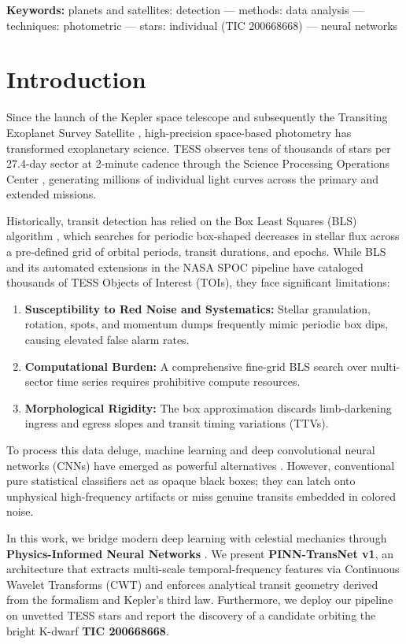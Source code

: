 \documentclass[11pt,a4paper]{article}
\begin{document}
\textbf{Keywords:} planets and satellites: detection --- methods: data analysis --- techniques: photometric --- stars: individual (TIC 200668668) --- neural networks

\clearpage

\section{Introduction}

Since the launch of the Kepler space telescope and subsequently the Transiting Exoplanet Survey Satellite \citep[TESS;][]{ricker2015transiting}, high-precision space-based photometry has transformed exoplanetary science. TESS observes tens of thousands of stars per 27.4-day sector at 2-minute cadence through the Science Processing Operations Center \citep[SPOC;][]{guerrero2021tess}, generating millions of individual light curves across the primary and extended missions.

Historically, transit detection has relied on the Box Least Squares (BLS) algorithm \citep{kovacs2002box}, which searches for periodic box-shaped decreases in stellar flux across a pre-defined grid of orbital periods, transit durations, and epochs. While BLS and its automated extensions in the NASA SPOC pipeline have cataloged thousands of TESS Objects of Interest (TOIs), they face significant limitations:
\begin{enumerate}
    \item \textbf{Susceptibility to Red Noise and Systematics:} Stellar granulation, rotation, spots, and momentum dumps frequently mimic periodic box dips, causing elevated false alarm rates.
    \item \textbf{Computational Burden:} A comprehensive fine-grid BLS search over multi-sector time series requires prohibitive compute resources.
    \item \textbf{Morphological Rigidity:} The box approximation discards limb-darkening ingress and egress slopes and transit timing variations (TTVs).
\end{enumerate}

To process this data deluge, machine learning and deep convolutional neural networks (CNNs) have emerged as powerful alternatives \citep{shallue2018identifying, pearson2018searching}. However, conventional pure statistical classifiers act as opaque black boxes; they can latch onto unphysical high-frequency artifacts or miss genuine transits embedded in colored noise. 

In this work, we bridge modern deep learning with celestial mechanics through \textbf{Physics-Informed Neural Networks} \citep[PINNs;][]{raissi2019physics}. We present \textbf{PINN-TransNet v1}, an architecture that extracts multi-scale temporal-frequency features via Continuous Wavelet Transforms (CWT) and enforces analytical transit geometry derived from the \citet{mandel2002analytic} formalism and Kepler's third law. Furthermore, we deploy our pipeline on unvetted TESS stars and report the discovery of a candidate orbiting the bright K-dwarf \textbf{TIC 200668668}.
\end{document}
